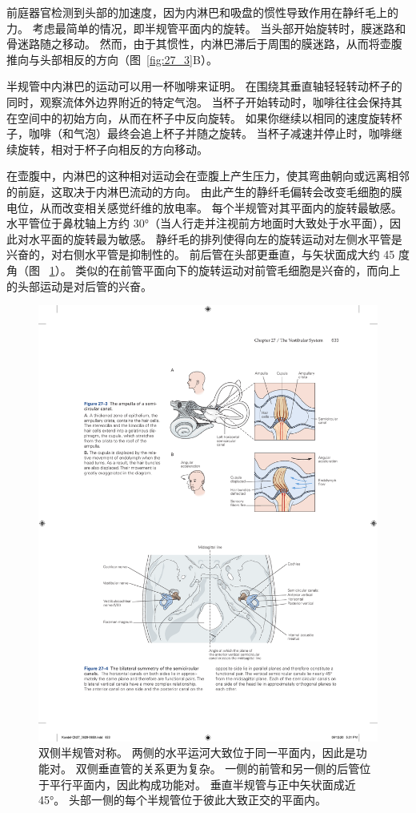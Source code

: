 前庭器官检测到头部的加速度，因为内淋巴和吸盘的惯性导致作用在静纤毛上的力。
考虑最简单的情况，即半规管平面内的旋转。
当头部开始旋转时，膜迷路和骨迷路随之移动。
然而，由于其惯性，内淋巴滞后于周围的膜迷路，从而将壶腹推向与头部相反的方向（图~\ref{fig:27_3}B）。


半规管中内淋巴的运动可以用一杯咖啡来证明。
在围绕其垂直轴轻轻转动杯子的同时，观察流体外边界附近的特定气泡。
当杯子开始转动时，咖啡往往会保持其在空间中的初始方向，从而在杯子中反向旋转。
如果你继续以相同的速度旋转杯子，咖啡（和气泡）最终会追上杯子并随之旋转。
当杯子减速并停止时，咖啡继续旋转，相对于杯子向相反的方向移动。


在壶腹中，内淋巴的这种相对运动会在壶腹上产生压力，使其弯曲朝向或远离相邻的前庭，这取决于内淋巴流动的方向。
由此产生的静纤毛偏转会改变毛细胞的膜电位，从而改变相关感觉纤维的放电率。
每个半规管对其平面内的旋转最敏感。 水平管位于鼻枕轴上方约 30°（当人行走并注视前方地面时大致处于水平面），因此对水平面的旋转最为敏感。
静纤毛的排列使得向左的旋转运动对左侧水平管是兴奋的，对右侧水平管是抑制性的。
前后管在头部更垂直，与矢状面成大约 45 度角（图 ~\ref{fig:27_4}）。 
类似的在前管平面向下的旋转运动对前管毛细胞是兴奋的，而向上的头部运动是对后管的兴奋。


\begin{figure}[htbp]
	\centering
	\includegraphics[width=0.75\linewidth]{chap27/fig_27_4}
	\caption{双侧半规管对称。 两侧的水平运河大致位于同一平面内，因此是功能对。 双侧垂直管的关系更为复杂。 一侧的前管和另一侧的后管位于平行平面内，因此构成功能对。 垂直半规管与正中矢状面成近 45°。 头部一侧的每个半规管位于彼此大致正交的平面内。}
	\label{fig:27_4}
\end{figure}


